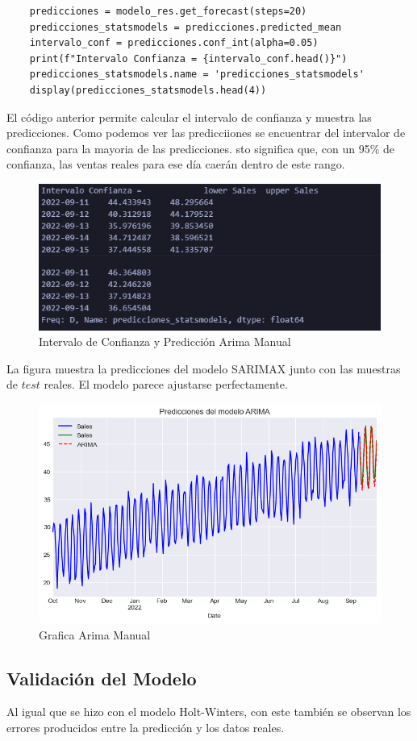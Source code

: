 \begin{lstlisting}
	predicciones = modelo_res.get_forecast(steps=20)
	predicciones_statsmodels = predicciones.predicted_mean
	intervalo_conf = predicciones.conf_int(alpha=0.05)
	print(f"Intervalo Confianza = {intervalo_conf.head()}")
	predicciones_statsmodels.name = 'predicciones_statsmodels'
	display(predicciones_statsmodels.head(4))
\end{lstlisting}

El código anterior permite calcular el intervalo de confianza y muestra las predicciones. Como podemos ver las predicciiones se encuentrar del intervalor de confianza para la mayoria de las predicciones. sto significa que, con un 95\% de confianza, las ventas reales para ese día caerán dentro de este rango.\\

\begin{figure}[!h]
	\centering
	\includegraphics[width=0.5\linewidth]{confianza_sarimax}
	\caption{Intervalo de Confianza y Predicción Arima Manual}
	\label{fig:confianzasarimax}
\end{figure}

La figura muestra la predicciones del modelo SARIMAX junto con las muestras de $test$ reales. El modelo parece ajustarse perfectamente. 
\begin{figure}[!h]
	\centering
	\includegraphics[width=0.7\linewidth]{sarimax}
	\caption{Grafica Arima Manual}
	\label{fig:sarimax}
\end{figure}

\newpage
\subsection{Validación del Modelo}
Al igual que se hizo con el modelo Holt-Winters, con este también se observan los errores producidos entre la predicción y los datos reales.

